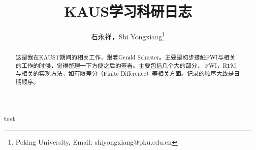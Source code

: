 \documentclass[UTF8, 10pt, a4paper]{article}
\title{KAUS学习科研日志}
\author{石永祥，Shi Yongxiang\footnote{Peking University, Email: shiyongxiang@pku.edu.cn}}
\begin{document}
    \maketitle
    \begin{abstract}
        这是我在KAUST期间的相关工作，跟着Gerald Schuster。主要是初步接触FWI与相关的工作的时候，觉得整理一下方便之后的查看。主要包括几个大的部分， FWI，RTM与相关的实现方法，如有限差分（Finite Difference）等相关方面。记录的顺序大致是日期顺序。
    \end{abstract}
    test    
\end{document}

